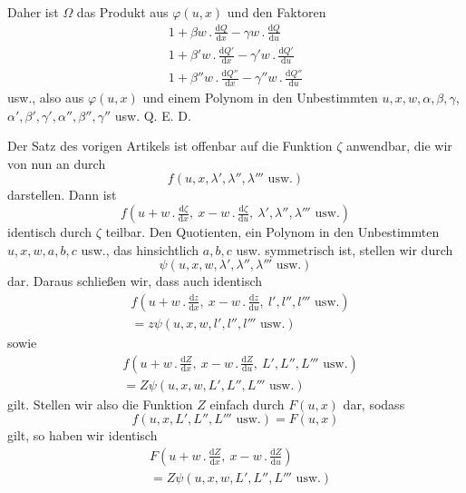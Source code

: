 Daher ist $\Omega$ das Produkt aus $\varphi(u,x)$ und den Faktoren
\[
\begin{gathered}
1+\beta w\, .\,\frac{\mathrm dQ}{\mathrm dx}-\gamma w\, .\,\frac{\mathrm dQ}{\mathrm du}\\
1+\beta'w\, .\,\frac{\mathrm dQ'}{\mathrm dx}-\gamma'w\, .\,\frac{\mathrm dQ'}{\mathrm du}\\
1+\beta''w\, .\,\frac{\mathrm dQ''}{\mathrm dx}-\gamma''w\, .\,\frac{\mathrm dQ''}{\mathrm du}
\end{gathered}
\]
usw., also aus $\varphi(u,x)$ und einem Polynom in den Unbestimmten $u,\allowbreak x,\allowbreak w,\allowbreak\alpha,\allowbreak\beta,\allowbreak\gamma$, $\alpha',\beta',\gamma',\alpha'',\beta'',\gamma''$ usw. Q. E. D.

Der Satz des vorigen Artikels ist offenbar auf die Funktion $\zeta$ anwendbar, die wir von nun an durch
\[
f(u,x,\lambda',\lambda'',\lambda'''\text{ usw.})
\]
darstellen. Dann ist
\[
f(u+w\, .\,\tfrac{\mathrm d\zeta}{\mathrm dx},\ x-w\, .\,\tfrac{\mathrm d\zeta}{\mathrm du},\ \lambda',\lambda'',\lambda'''\text{ usw.})
\]
identisch durch $\zeta$ teilbar. Den Quotienten, ein Polynom in den Unbestimmten $u,x,w,a,b,c$ usw., das hinsichtlich $a,b,c$ usw. symmetrisch ist, stellen wir durch
\[
\psi(u,x,w,\lambda',\lambda'',\lambda'''\text{ usw.})
\]
dar. Daraus schließen wir, dass auch identisch
\[
\begin{aligned}
&f(u+w\, .\,\tfrac{\mathrm dz}{\mathrm dx},\ x-w\, .\,\tfrac{\mathrm dz}{\mathrm du},\ l',l'',l'''\text{ usw.})\\
&=z\psi(u,x,w,l',l'',l'''\text{ usw.})
\end{aligned}
\]
sowie
\[
\begin{aligned}
&f(u+w\, .\,\tfrac{\mathrm dZ}{\mathrm dx},\ x-w\, .\,\tfrac{\mathrm dZ}{\mathrm du},\ L',L'',L'''\text{ usw.})\\
&=Z\psi(u,x,w,L',L'',L'''\text{ usw.})
\end{aligned}
\]
gilt. Stellen wir also die Funktion $Z$ einfach durch $F(u,x)$ dar, sodass
\[
f(u,x,L',L'',L'''\text{ usw.})=F(u,x)
\]
gilt, so haben wir identisch
\[
\begin{aligned}
&F(u+w\, .\,\tfrac{\mathrm dZ}{\mathrm dx},\ x-w\, .\,\tfrac{\mathrm dZ}{\mathrm du})\\
&=Z\psi(u,x,w,L',L'',L'''\text{ usw.})
\end{aligned}
\]

